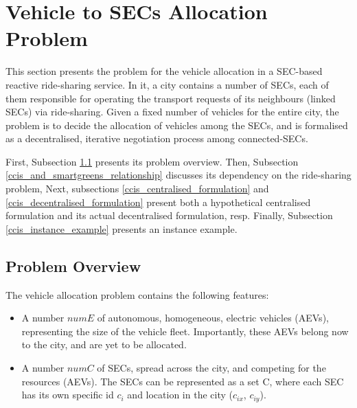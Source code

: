\section{Vehicle to SECs Allocation Problem}
\label{sec:ccis_problem}
This section presents the problem for the vehicle allocation in a SEC-based reactive ride-sharing service.
In it, a city contains a number of SECs, each of them responsible for operating the transport requests of its neighbours (linked SECs) via ride-sharing.
Given a fixed number of vehicles for the entire city, the problem is to decide the allocation of vehicles among the SECs,
and is formalised as a decentralised, iterative negotiation process among connected-SECs.

First, Subsection \ref{ccis_problem_overview} presents its problem overview.
Then, Subsection \ref{ccis_and_smartgreens_relationship} discusses its dependency on the ride-sharing problem,
Next, subsections \ref{ccis_centralised_formulation} and \ref{ccis_decentralised_formulation} present both a
hypothetical centralised formulation and its actual decentralised formulation, resp.
Finally, Subsection \ref{ccis_instance_example} presents an instance example.




\subsection{Problem Overview}
\label{ccis_problem_overview}

The vehicle allocation problem contains the following features:
\begin{itemize}
\item A number $numE$ of autonomous, homogeneous, electric vehicles (AEVs), representing the size of the vehicle fleet.
      Importantly, these AEVs belong now to the city, and are yet to be allocated.
\item A number $numC$ of SECs, spread across the city, and competing for the resources (AEVs).
      The SECs can be represented as a set C, where each SEC has its own specific id $c_i$
      and location in the city ($c_{ix}$,  $c_{iy}$).
\end{itemize}

